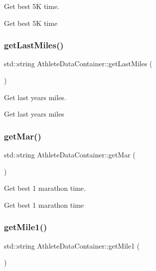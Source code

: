 Get best 5K time. 

Get best 5K time \mbox{\label{classAthleteDataContainer_a30cf81a80f249aa3e81db1e0a712e33f}} 
\subsubsection{\texorpdfstring{getLastMiles()}{getLastMiles()}}
{\footnotesize\ttfamily std\+::string Athlete\+Data\+Container\+::get\+Last\+Miles (\begin{DoxyParamCaption}{ }\end{DoxyParamCaption})}



Get last years miles. 

Get last years miles \mbox{\label{classAthleteDataContainer_af850c53098bf3b2977274332a22ab52e}} 
\subsubsection{\texorpdfstring{getMar()}{getMar()}}
{\footnotesize\ttfamily std\+::string Athlete\+Data\+Container\+::get\+Mar (\begin{DoxyParamCaption}{ }\end{DoxyParamCaption})}



Get best 1 marathon time. 

Get best 1 marathon time \mbox{\label{classAthleteDataContainer_a0604aa7dad1956552ed2571e1188ba12}} 
\subsubsection{\texorpdfstring{getMile1()}{getMile1()}}
{\footnotesize\ttfamily std\+::string Athlete\+Data\+Container\+::get\+Mile1 (\begin{DoxyParamCaption}{ }\end{DoxyParamCaption})}



